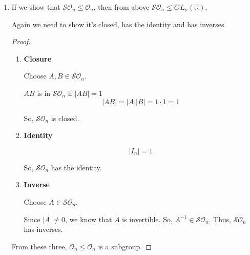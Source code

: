 \documentclass[12pt,letterpaper]{article}
\begin{document}
\begin{enumerate}
\begin{enumerate}
        \item
          If we show that $\mathcal{SO}_n \le \mathcal{O}_n$,
          then from above $\mathcal{SO}_n \le GL_n(\mathbb{R})$.

          Again we need to show it's closed, has the identity and has inverses.

          \begin{proof}
            \begin{enumerate}
              \item \textbf{Closure}

                Choose $A, B \in \mathcal{SO}_n$.

                $AB$ is in $\mathcal{SO}_n$ if $|AB| = 1$
                \[
                  |AB| = |A||B| = 1 \cdot 1 = 1
                \]

                So, $\mathcal{SO}_n$ is closed.

              \item \textbf{Identity}

                \[
                  |I_n| = 1
                \]

                So, $\mathcal{SO}_n$ has the identity.
              \item \textbf{Inverse}

                Choose $A \in \mathcal{SO}_n$.

                Since $|A| \ne 0$, we know that $A$ is invertible.
                So, $A^{-1} \in \mathcal{SO}_n$.
                Thus, $\mathcal{SO}_n$ has inverses.
            \end{enumerate}

            From these three, $\mathcal{O}_n \le \mathcal{O}_n$ is a subgroup.
          \end{proof}
      \end{enumerate}
  \end{enumerate}
\end{document}
